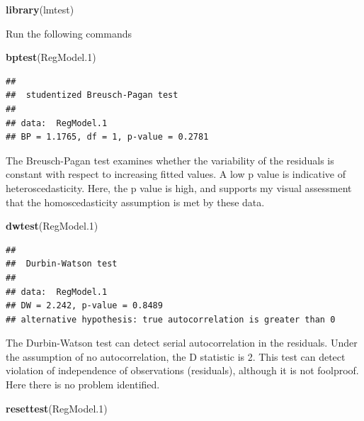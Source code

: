 \documentclass[
  12pt,
]{book}
\makeatletter
\newenvironment{Shaded}{\begin{snugshade}}{\end{snugshade}}
\newcommand{\FloatTok}[1]{\textcolor[rgb]{0.00,0.00,0.81}{#1}}
\newcommand{\KeywordTok}[1]{\textcolor[rgb]{0.13,0.29,0.53}{\textbf{#1}}}
\newcommand{\NormalTok}[1]{#1}
\newenvironment{kframe}{%
\medskip{}
\setlength{\fboxsep}{.8em}
\def\at@end@of@kframe{}%
\ifinner\ifhmode%
 \def\at@end@of@kframe{\end{minipage}}%
 \begin{minipage}{\columnwidth}%
\fi\fi%
\def\FrameCommand##1{\hskip\@totalleftmargin \hskip-\fboxsep
\colorbox{incolor}{##1}\hskip-\fboxsep
    \hskip-\linewidth \hskip-\@totalleftmargin \hskip\columnwidth}%
\MakeFramed {\advance\hsize-\width
  \@totalleftmargin\z@ \linewidth\hsize
  \@setminipage}}%
{\par\unskip\endMakeFramed%
\at@end@of@kframe}
\newenvironment{rmdblock}[1]
 {
 \begin{itemize}
 \renewcommand{\labelitemi}{
   \raisebox{-.7\height}[0pt][0pt]{
     {\setkeys{Gin}{width=3em,keepaspectratio}\texttt{[image: images/\#1]}}
   }
 }
 \begin{kframe}
 \setlength{\fboxsep}{1em}
 \item
 }
 {
 \end{kframe}
 \end{itemize}
 }
\newenvironment{rmdcode}
  {\begin{rmdblock}{screen}}
  {\end{rmdblock}}
\makeatother
\begin{document}
\begin{Shaded}
\begin{Highlighting}[]
\KeywordTok{library}\NormalTok{(lmtest)}
\end{Highlighting}
\end{Shaded}

\begin{rmdcode}
Run the following commands
\end{rmdcode}

\begin{Shaded}
\begin{Highlighting}[]
\KeywordTok{bptest}\NormalTok{(RegModel}\FloatTok{.1}\NormalTok{)}
\end{Highlighting}
\end{Shaded}

\begin{verbatim}
## 
##  studentized Breusch-Pagan test
## 
## data:  RegModel.1
## BP = 1.1765, df = 1, p-value = 0.2781
\end{verbatim}

The Breusch-Pagan test examines whether the variability of the residuals is constant with respect to increasing fitted values. A low p value is indicative of heteroscedasticity. Here, the p value is high, and supports my visual assessment that the homoscedasticity assumption is met by these data.

\begin{Shaded}
\begin{Highlighting}[]
\KeywordTok{dwtest}\NormalTok{(RegModel}\FloatTok{.1}\NormalTok{)}
\end{Highlighting}
\end{Shaded}

\begin{verbatim}
## 
##  Durbin-Watson test
## 
## data:  RegModel.1
## DW = 2.242, p-value = 0.8489
## alternative hypothesis: true autocorrelation is greater than 0
\end{verbatim}

The Durbin-Watson test can detect serial autocorrelation in the residuals. Under the assumption of no autocorrelation, the D statistic is 2. This test can detect violation of independence of observations (residuals), although it is not foolproof. Here there is no problem identified.

\begin{Shaded}
\begin{Highlighting}[]
\KeywordTok{resettest}\NormalTok{(RegModel}\FloatTok{.1}\NormalTok{)}
\end{Highlighting}
\end{Shaded}
\end{document}
